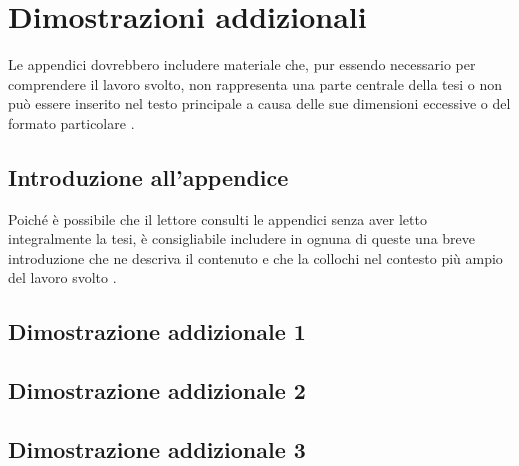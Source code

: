 \chapter{Dimostrazioni addizionali}
\label{appendix:dimostrazioni}

\acresetall

Le appendici dovrebbero includere materiale che, pur essendo necessario per comprendere il lavoro svolto, non rappresenta una parte centrale della tesi o non può essere inserito nel testo principale a causa delle sue dimensioni eccessive o del formato particolare \cite{tuni2019guide}.

\section{Introduzione all'appendice}

Poiché è possibile che il lettore consulti le appendici senza aver letto integralmente la tesi, è consigliabile includere in ognuna di queste una breve introduzione che ne descriva il contenuto e che la collochi nel contesto più ampio del lavoro svolto \cite{tuni2019guide}.

\section{Dimostrazione addizionale 1}

\section{Dimostrazione addizionale 2}

\section{Dimostrazione addizionale 3}